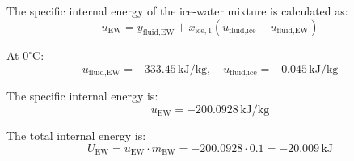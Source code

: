 The specific internal energy of the ice-water mixture is calculated as:  
\[
u_{\text{EW}} = y_{\text{fluid,EW}} + x_{\text{ice},1} (u_{\text{fluid,ice}} - u_{\text{fluid,EW}})
\]

At \( 0^\circ \text{C} \):  
\[
u_{\text{fluid,EW}} = -333.45 \, \text{kJ/kg}, \quad u_{\text{fluid,ice}} = -0.045 \, \text{kJ/kg}
\]

The specific internal energy is:  
\[
u_{\text{EW}} = -200.0928 \, \text{kJ/kg}
\]

The total internal energy is:  
\[
U_{\text{EW}} = u_{\text{EW}} \cdot m_{\text{EW}} = -200.0928 \cdot 0.1 = -20.009 \, \text{kJ}
\]